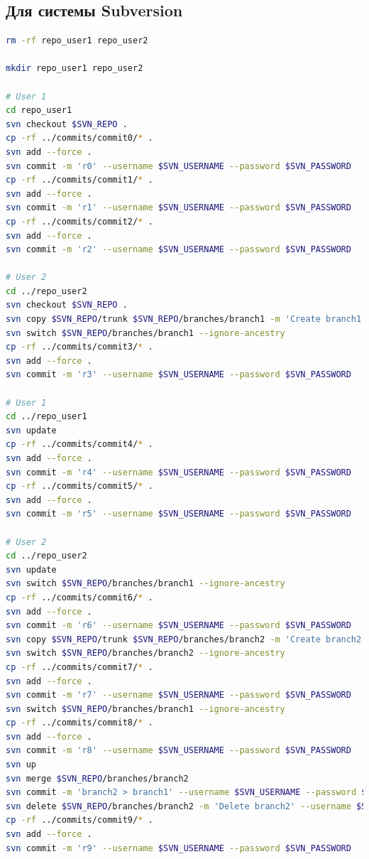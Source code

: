 \documentclass[12pt,a4paper]{article}
\begin{document}
\subsection{Для системы Subversion}
\begin{lstlisting}[language=Bash]
rm -rf repo_user1 repo_user2

mkdir repo_user1 repo_user2

# User 1
cd repo_user1
svn checkout $SVN_REPO .
cp -rf ../commits/commit0/* .
svn add --force .
svn commit -m 'r0' --username $SVN_USERNAME --password $SVN_PASSWORD
cp -rf ../commits/commit1/* .
svn add --force .
svn commit -m 'r1' --username $SVN_USERNAME --password $SVN_PASSWORD
cp -rf ../commits/commit2/* .
svn add --force .
svn commit -m 'r2' --username $SVN_USERNAME --password $SVN_PASSWORD

# User 2
cd ../repo_user2
svn checkout $SVN_REPO .
svn copy $SVN_REPO/trunk $SVN_REPO/branches/branch1 -m 'Create branch1'
svn switch $SVN_REPO/branches/branch1 --ignore-ancestry
cp -rf ../commits/commit3/* .
svn add --force .
svn commit -m 'r3' --username $SVN_USERNAME --password $SVN_PASSWORD

# User 1
cd ../repo_user1
svn update
cp -rf ../commits/commit4/* .
svn add --force .
svn commit -m 'r4' --username $SVN_USERNAME --password $SVN_PASSWORD
cp -rf ../commits/commit5/* .
svn add --force .
svn commit -m 'r5' --username $SVN_USERNAME --password $SVN_PASSWORD

# User 2
cd ../repo_user2
svn update
svn switch $SVN_REPO/branches/branch1 --ignore-ancestry
cp -rf ../commits/commit6/* .
svn add --force .
svn commit -m 'r6' --username $SVN_USERNAME --password $SVN_PASSWORD
svn copy $SVN_REPO/trunk $SVN_REPO/branches/branch2 -m 'Create branch2'
svn switch $SVN_REPO/branches/branch2 --ignore-ancestry
cp -rf ../commits/commit7/* .
svn add --force .
svn commit -m 'r7' --username $SVN_USERNAME --password $SVN_PASSWORD
svn switch $SVN_REPO/branches/branch1 --ignore-ancestry
cp -rf ../commits/commit8/* .
svn add --force .
svn commit -m 'r8' --username $SVN_USERNAME --password $SVN_PASSWORD
svn up
svn merge $SVN_REPO/branches/branch2
svn commit -m 'branch2 > branch1' --username $SVN_USERNAME --password $SVN_PASSWORD
svn delete $SVN_REPO/branches/branch2 -m 'Delete branch2' --username $SVN_USERNAME --password $SVN_PASSWORD
cp -rf ../commits/commit9/* .
svn add --force .
svn commit -m 'r9' --username $SVN_USERNAME --password $SVN_PASSWORD


\end{lstlisting}
\end{document}
